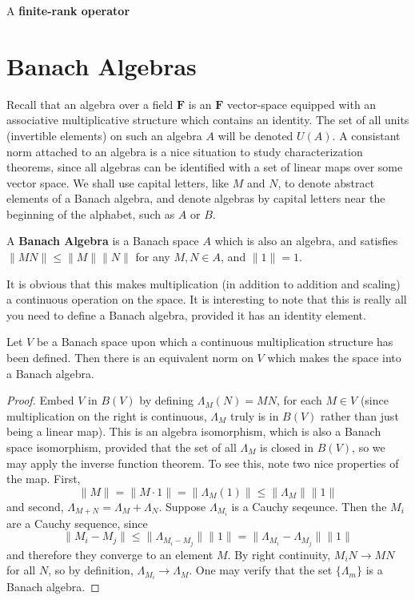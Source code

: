 \begin{definition}
    A {\bf finite-rank operator}
\end{definition}




\chapter{Banach Algebras}

Recall that an algebra over a field $\mathbf{F}$ is an $\mathbf{F}$ vector-space equipped with an associative multiplicative structure which contains an identity. The set of all units (invertible elements) on such an algebra $A$ will be denoted $U(A)$. A consistant norm attached to an algebra is a nice situation to study characterization theorems, since all algebras can be identified with a set of linear maps over some vector space. We shall use capital letters, like $M$ and $N$, to denote abstract elements of a Banach algebra, and denote algebras by capital letters near the beginning of the alphabet, such as $A$ or $B$.

\begin{definition}
    A {\bf Banach Algebra} is a Banach space $A$ which is also an algebra, and satisfies $\| MN \| \leq \| M \| \| N \|$ for any $M,N \in A$, and $\| 1 \| = 1$.
\end{definition}

It is obvious that this makes multiplication (in addition to addition and scaling) a continuous operation on the space. It is interesting to note that this is really all you need to define a Banach algebra, provided it has an identity element.

\begin{theorem}
    Let $V$ be a Banach space upon which a continuous multiplication structure has been defined. Then there is an equivalent norm on $V$ which makes the space into a Banach algebra.
\end{theorem}
\begin{proof}
    Embed $V$ in $B(V)$ by defining $\Lambda_M(N) = MN$, for each $M \in V$ (since multiplication on the right is continuous, $\Lambda_M$ truly is in $B(V)$ rather than just being a linear map). This is an algebra isomorphism, which is also a Banach space isomorphism, provided  that the set of all $\Lambda_M$ is closed in $B(V)$, so we may apply the inverse function theorem. To see this, note two nice properties of the map. First,
    \[ \| M \| = \| M \cdot 1 \| = \| \Lambda_{M}(1) \| \leq \| \Lambda_{M} \| \| 1 \|  \]
    and second, $\Lambda_{M + N} = \Lambda_M + \Lambda_N$. Suppose $\Lambda_{M_i}$ is a Cauchy seqeunce. Then the $M_i$ are a Cauchy sequence, since
    \[ \| M_i - M_j \| \leq \| \Lambda_{M_i - M_j} \| \| 1 \| = \| \Lambda_{M_i} - \Lambda_{M_j} \| \| 1 \| \]
    and therefore they converge to an element $M$. By right continuity, $M_i N \to M N$ for all $N$, so by definition, $\Lambda_{M_i} \to \Lambda_M$. One may verify that the set $\{ \Lambda_m \}$ is a Banach algebra.
\end{proof}

